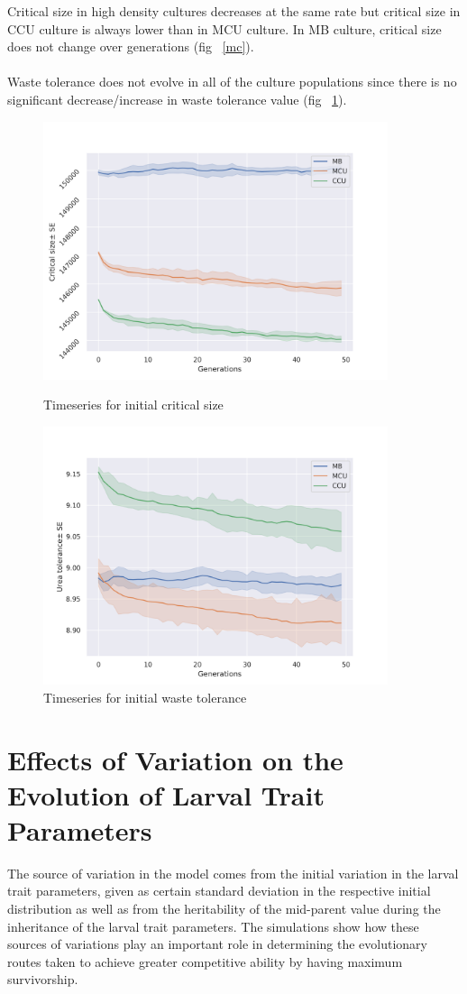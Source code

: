 \newpage
Critical size in high density cultures decreases at the same rate but critical size in CCU culture is always lower than in MCU culture. In MB culture, critical size does not change over generations (fig ~\ref{mc}). \\\\
Waste tolerance does not evolve in all of the culture populations since there is no significant decrease/increase in waste tolerance value (fig ~\ref{wtol}).
\newpage
\begin{figure}[h]
  \centering
  \includegraphics[width=0.9\textwidth]{C4/Figs/mc}
  \caption{Timeseries for initial critical size}
  \label{mc}
  \includegraphics[width=0.9\textwidth]{C4/Figs/wtol}
  \caption{Timeseries for initial waste tolerance}
  \label{wtol}
\end{figure}
\newpage
\section{Effects of Variation on the Evolution of Larval Trait Parameters}
The source of variation in the model comes from the initial variation in the larval trait parameters, given as certain standard deviation in the respective initial distribution as well as from the heritability of the mid-parent value during the inheritance of the larval trait parameters. The simulations show how these sources of variations play an important role in determining the evolutionary routes taken to achieve greater competitive ability by having maximum survivorship.

